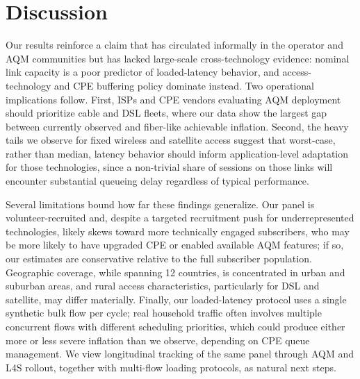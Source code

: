 \section{Discussion}
\label{sec:discussion}
Our results reinforce a claim that has circulated informally in the operator and AQM
communities but has lacked large-scale cross-technology evidence: nominal link capacity
is a poor predictor of loaded-latency behavior, and access-technology and CPE buffering
policy dominate instead. Two operational implications follow. First, ISPs and CPE vendors
evaluating AQM deployment should prioritize cable and DSL fleets, where our data show the
largest gap between currently observed and fiber-like achievable inflation. Second, the
heavy tails we observe for fixed wireless and satellite access suggest that
worst-case, rather than median, latency behavior should inform application-level
adaptation for those technologies, since a non-trivial share of sessions on those links
will encounter substantial queueing delay regardless of typical performance.

Several limitations bound how far these findings generalize. Our panel is
volunteer-recruited and, despite a targeted recruitment push for underrepresented
technologies, likely skews toward more technically engaged subscribers, who may be more
likely to have upgraded CPE or enabled available AQM features; if so, our estimates are
conservative relative to the full subscriber population. Geographic coverage, while
spanning 12 countries, is concentrated in urban and suburban areas, and rural access
characteristics, particularly for DSL and satellite, may differ materially. Finally, our
loaded-latency protocol uses a single synthetic bulk flow per cycle; real household
traffic often involves multiple concurrent flows with different scheduling priorities,
which could produce either more or less severe inflation than we observe, depending on
CPE queue management. We view longitudinal tracking of the same panel through AQM and
L4S rollout, together with multi-flow loading protocols, as natural next steps.
